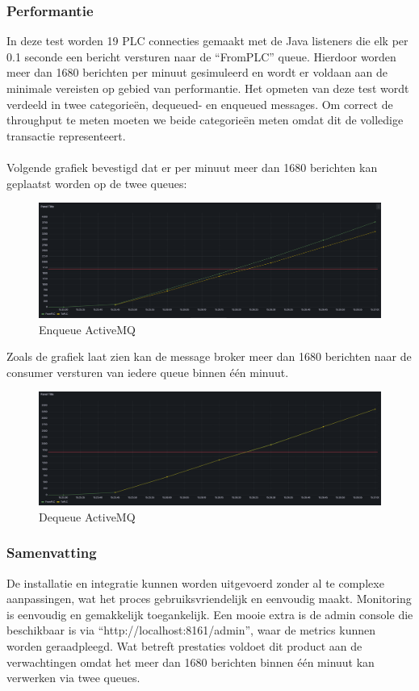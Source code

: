 \subsubsection{Performantie}
In deze test worden 19 PLC connecties gemaakt met de Java listeners die elk per 0.1 seconde een bericht versturen naar de  ``FromPLC'' queue.
Hierdoor worden meer dan 1680 berichten per minuut gesimuleerd en wordt er voldaan aan de minimale vereisten op gebied van performantie.
Het opmeten van deze test wordt verdeeld in twee categorieën, dequeued- en enqueued messages.
Om correct de throughput te meten moeten we beide categorieën meten omdat dit de volledige transactie representeert. 
\\\\
Volgende grafiek bevestigd dat er per minuut meer dan 1680 berichten kan geplaatst worden op de twee queues:
\begin{figure}[h!]
  \centering
  \includegraphics[width=.95\textwidth]{img/amq-enqueue-count.png}
  \caption{\label{fig:amq_enqueue_count}Enqueue ActiveMQ}
\end{figure}
\newpage
Zoals de grafiek laat zien kan de message broker meer dan 1680 berichten naar de consumer versturen van iedere queue binnen één minuut.
\begin{figure}[h!]
  \centering
  \includegraphics[width=.95\textwidth]{img/amq-dequeue-count.png}
  \caption{\label{fig:amq_dequeue_count}Dequeue ActiveMQ}
\end{figure}

\subsubsection{Samenvatting}
De installatie en integratie kunnen worden uitgevoerd zonder al te complexe aanpassingen, 
wat het proces gebruiksvriendelijk en eenvoudig maakt.
Monitoring is eenvoudig en gemakkelijk toegankelijk. 
Een mooie extra is de admin console die beschikbaar is via ``http://localhost:8161/admin'', waar de metrics kunnen worden geraadpleegd.
Wat betreft prestaties voldoet dit product aan de verwachtingen omdat het meer dan 1680 berichten binnen één minuut kan verwerken via twee queues.

